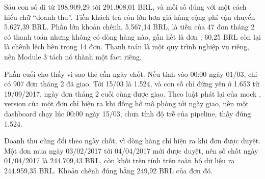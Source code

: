Sáu con số đi từ 198.909,29 tới 291.908,01 BRL, và mỗi số đúng với một cách hiểu chữ ``doanh thu''. Tiền khách trả còn lớn hơn giá hàng cộng phí vận chuyển 5.627,39 BRL. Phần lớn khoản chênh, 5.567,14 BRL, là tiền của 47 đơn tháng 2 có thanh toán nhưng không có dòng hàng nào, gần hết là đơn ; 60,25 BRL còn lại là chênh lệch bên trong 14 đơn. Thanh toán là một quy trình nghiệp vụ riêng, nên Module 3 tách nó thành một fact riêng.

Phần cuối cho thấy vì sao thẻ cần ngày chốt. Nếu tính vào 00:00 ngày 01/03, chỉ có 907 đơn tháng 2 đã giao. Tới 15/03 là 1.524, và con số chỉ đứng yên ở 1.653 từ 19/09/2017, ngày đơn tháng 2 cuối cùng được giao. Theo luật phát lại của mock , version  của một đơn chỉ hiện ra khi đồng hồ mô phỏng tới ngày giao, nên một dashboard chạy lúc 00:00 ngày 15/03, chưa tính độ trễ của pipeline, thấy đúng 1.524.

Doanh thu cũng đổi theo ngày chốt, vì dòng hàng chỉ hiện ra khi đơn được duyệt. Một đơn mua ngày 03/02/2017 tới 04/04/2017 mới được duyệt, nên số chốt ngày 01/04/2017 là 244.709,43 BRL, còn khối trên tính trên toàn bộ dữ liệu ra 244.959,35 BRL. Khoản chênh đúng bằng 249,92 BRL của đơn đó.

